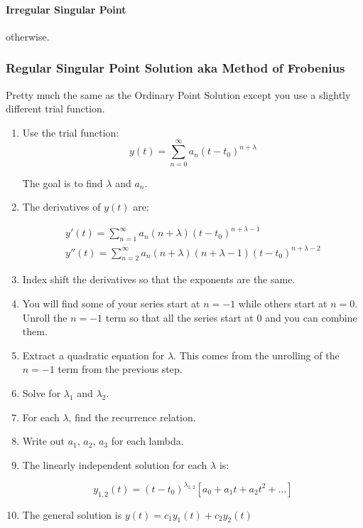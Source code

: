 \documentclass[11pt]{article}
\begin{document}
 \paragraph{Irregular Singular Point} otherwise.

\subsubsection*{Regular Singular Point Solution aka Method of Frobenius}
Pretty much the same as the Ordinary Point Solution except you use a slightly different trial function.

\begin{enumerate}

\item Use the trial function:
$$y(t)= \sum \limits_{n=0}^{\infty} a_n(t-t_0)^{n+\lambda}$$

The goal is to find $\lambda$ and $a_n$.

\item The derivatives of $y(t)$ are:

\begin{gather*}
y'(t)= \sum \limits_{n=1}^{\infty} a_n (n+\lambda) (t-t_0)^{n+\lambda-1} \\
y''(t)= \sum \limits_{n=2}^{\infty} a_n (n+\lambda) (n+\lambda-1)(t-t_0)^{n+\lambda-2}
\end{gather*}

\item Index shift the derivatives so that the exponents are the same.
\item You will find some of your series start at $n=-1$ while others start at $n=0$. Unroll the $n=-1$ term so that all the series start at 0 and you can combine them.
\item Extract a quadratic equation for $\lambda$. This comes from the unrolling of the $n=-1$ term from the previous step.
\item Solve for $\lambda_1$ and $\lambda_2$.
\item For each $\lambda$, find the recurrence relation.
\item Write out $a_1$, $a_2$, $a_3$ for each lambda.
\item The linearly independent solution for each $\lambda$ is:

$$y_{1,2}(t) = (t-t_0)^{\lambda_{1,2}}[a_0 + a_1t + a_2t^2 + ... ] $$

\item The general solution is $y(t) = c_1y_1(t) + c_2y_2(t)$

\end{enumerate}
\end{document}
